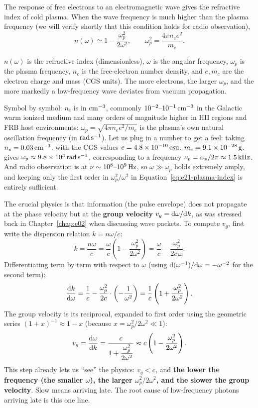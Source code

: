 The response of free electrons to an electromagnetic wave gives the refractive index of cold plasma. When the wave frequency is much higher than the plasma frequency (we will verify shortly that this condition holds for radio observation),
\begin{equation}
  n(\omega)\simeq 1-\frac{\omega_p^2}{2\omega^2},
  \qquad
  \omega_p^2=\frac{4\pi n_e e^2}{m_e}.
  \label{eq:e21-plasma-index}
\end{equation}
\begin{formulaexplain}
\(n(\omega)\) is the refractive index (dimensionless), \(\omega\) is the angular frequency, \(\omega_p\) is the plasma frequency, \(n_e\) is the free-electron number density, and \(e,m_e\) are the electron charge and mass (CGS units). The more electrons, the larger \(\omega_p\), and the more markedly a low-frequency wave deviates from vacuum propagation.
\end{formulaexplain}
Symbol by symbol: \(n_e\) is in \({\rm cm^{-3}}\), commonly \(10^{-2}\text{--}10^{-1}\,{\rm cm^{-3}}\) in the Galactic warm ionized medium and many orders of magnitude higher in HII regions and FRB host environments; \(\omega_p=\sqrt{4\pi n_e e^2/m_e}\) is the plasma's own natural oscillation frequency (in \({\rm rad\,s^{-1}}\)). Let us plug in a number to get a feel: taking \(n_e=0.03\,{\rm cm^{-3}}\), with the CGS values \(e=4.8\times10^{-10}\,{\rm esu}\), \(m_e=9.1\times10^{-28}\,{\rm g}\), gives \(\omega_p\approx 9.8\times10^{3}\,{\rm rad\,s^{-1}}\), corresponding to a frequency \(\nu_p=\omega_p/2\pi\approx1.5\,{\rm kHz}\). And radio observation is at \(\nu\sim10^{8}\text{--}10^{9}\,{\rm Hz}\), so \(\omega\gg\omega_p\) holds extremely amply, and keeping only the first order in \(\omega_p^2/\omega^2\) in Equation~\eqref{eq:e21-plasma-index} is entirely sufficient.

The crucial physics is that information (the pulse envelope) does not propagate at the phase velocity but at the \textbf{group velocity} \(v_g={\rm d}\omega/{\rm d}k\), as was stressed back in Chapter~\ref{chap:e02} when discussing wave packets. To compute \(v_g\), first write the dispersion relation \(k=n\omega/c\):
\[
  k=\frac{n\omega}{c}
   =\frac{\omega}{c}\left(1-\frac{\omega_p^2}{2\omega^2}\right)
   =\frac{\omega}{c}-\frac{\omega_p^2}{2c\,\omega}.
\]
Differentiating term by term with respect to \(\omega\) (using \({\rm d}(\omega^{-1})/{\rm d}\omega=-\omega^{-2}\) for the second term):
\[
  \frac{{\rm d}k}{{\rm d}\omega}
  =\frac{1}{c}-\frac{\omega_p^2}{2c}\cdot\left(-\frac{1}{\omega^2}\right)
  =\frac{1}{c}\left(1+\frac{\omega_p^2}{2\omega^2}\right).
\]
The group velocity is its reciprocal, expanded to first order using the geometric series \((1+x)^{-1}\approx1-x\) (because \(x=\omega_p^2/2\omega^2\ll1\)):
\[
  v_g=\frac{{\rm d}\omega}{{\rm d}k}
     =\frac{c}{1+\dfrac{\omega_p^2}{2\omega^2}}
     \approx c\left(1-\frac{\omega_p^2}{2\omega^2}\right).
\]
This step already lets us ``see'' the physics: \(v_g<c\), and \textbf{the lower the frequency (the smaller \(\omega\)), the larger \(\omega_p^2/2\omega^2\), and the slower the group velocity}. Slow means arriving late. The root cause of low-frequency photons arriving late is this one line.

